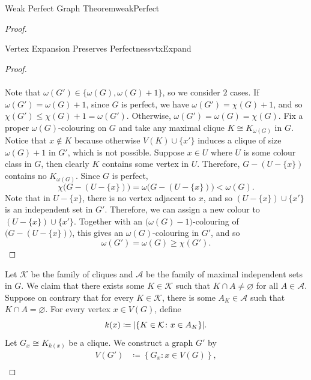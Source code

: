 \documentclass[math]{amznotes}
\theoremstyle{remark}
\newcommand{\0}{\mathbf{0}}
\newcommand{\1}{\mathbf{1}}
\begin{document}
\begin{thmbox}{Weak Perfect Graph Theorem}{weakPerfect}
\begin{proof}
\begin{lembox}{Vertex Expansion Preserves Perfectness}{vtxExpand}
\begin{proof}
                \\\\
                Note that $\omega(G') \in \{\omega(G), \omega(G) + 1\}$, so we consider $2$ cases. If $\omega(G') = \omega(G) + 1$, since $G$ is perfect, we have $\omega(G') = \chi(G) + 1$, and so $\chi(G') \leq \chi(G) + 1 = \omega(G')$. Otherwise, $\omega(G') = \omega(G) = \chi(G)$. Fix a proper $\omega(G)$-colouring on $G$ and take any maximal clique $K \cong K_{\omega(G)}$ in $G$. Notice that $x \notin K$ because otherwise $V(K) \cup \{x'\}$ induces a clique of size $\omega(G) + 1$ in $G'$, which is not possible. Suppose $x \in U$ where $U$ is some colour class in $G$, then clearly $K$ contains some vertex in $U$. Therefore, $G - (U - \{x\})$ contains no $K_{\omega(G)}$. Since $G$ is perfect,
                \begin{equation*}
                    \chi\bigl(G - (U - \{x\})\bigr) = \omega\bigl(G - (U - \{x\})\bigr) < \omega(G).
                \end{equation*}
                Note that in $U - \{x\}$, there is no vertex adjacent to $x$, and so $(U - \{x\}) \cup \{x'\}$ is an independent set in $G'$. Therefore, we can assign a new colour to $(U - \{x\}) \cup \{x'\}$. Together with an $\bigl(\omega(G) - 1\bigr)$-colouring of $\bigl(G - (U - \{x\})\bigr)$, this gives an $\omega(G)$-colouring in $G'$, and so 
                \begin{equation*}
                    \omega(G') = \omega(G) \geq \chi(G').
                \end{equation*}
            \end{proof}
        \end{lembox}
        Let $\mathcal{K}$ be the family of cliques and $\mathcal{A}$ be the family of maximal independent sets in $G$. We claim that there exists some $K \in \mathcal{K}$ such that $K \cap A \neq \varnothing$ for all $A \in \mathcal{A}$. Suppose on contrary that for every $K \in \mathcal{K}$, there is some $A_K \in \mathcal{A}$ such that $K \cap A = \varnothing$. For every vertex $x \in V(G)$, define 
        \begin{equation*}
            k(x) \coloneqq {\left\lvert {\left\{K \in \mathcal{K} \colon x \in A_K\right\}} \right\rvert}.
        \end{equation*}
        Let $G_x \cong K_{k(x)}$ be a clique. We construct a graph $G'$ by 
        \begin{align*}
            V(G') & \coloneqq \left\{G_x \colon x \in V(G)\right\}, \\

\end{align*}
\end{proof}
\end{thmbox}
\end{document}
